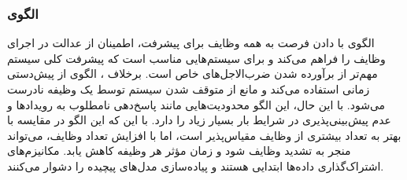 \subsubsection{الگوی }
\label{archConRoundRobSec}
\begin{RTL}
الگوی  با دادن فرصت به همه وظایف برای پیشرفت،
اطمینان از عدالت در اجرای وظایف را فراهم می‌کند و برای سیستم‌هایی مناسب
است که پیشرفت کلی سیستم مهم‌تر از برآورده شدن ضرب‌الاجل‌های خاص است.
برخلاف ، الگوی  از پیش‌دستی زمانی
استفاده می‌کند و مانع از متوقف شدن سیستم توسط یک وظیفه
نادرست می‌شود. با این حال، این الگو محدودیت‌هایی مانند پاسخ‌دهی
نامطلوب به رویدادها و عدم پیش‌بینی‌پذیری در شرایط بار بسیار زیاد
را دارد. با این که این الگو در مقایسه با  بهتر به تعداد بیشتری از
وظایف مقیاس‌پذیر است، اما با افزایش تعداد وظایف، می‌تواند منجر به تشدید وظایف شود
و زمان مؤثر هر وظیفه کاهش یابد. مکانیزم‌های اشتراک‌گذاری داده‌ها ابتدایی هستند
و پیاده‌سازی مدل‌های پیچیده را دشوار می‌کنند.
\end{RTL}